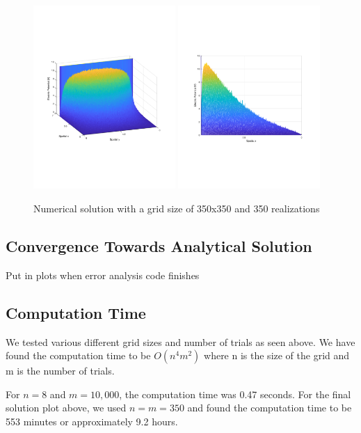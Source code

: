 \documentclass{amsart}
\begin{document}
\begin{figure}[H]
	\caption{Numerical solution with a grid size of 350x350 and 350 realizations}
	\includegraphics[width=0.48\textwidth]{solution_Dec11_9hrs_isoview.pdf}
	\includegraphics[width=0.48\textwidth]{solution_Dec11_9hrs_sideview.pdf}
\end{figure}

\subsection{Convergence Towards Analytical Solution}

Put in plots when error analysis code finishes

\subsection{Computation Time}

We tested various different grid sizes and number of trials as seen above. We have found the computation time to be $O(n^4m^2)$ where n is the size of the grid and m is the number of trials.

For $n = 8$ and $m = 10,000$, the computation time was 0.47 seconds. For the final solution plot above, we used $n = m = 350$ and found the computation time to be 553 minutes or approximately 9.2 hours.



\end{document}
